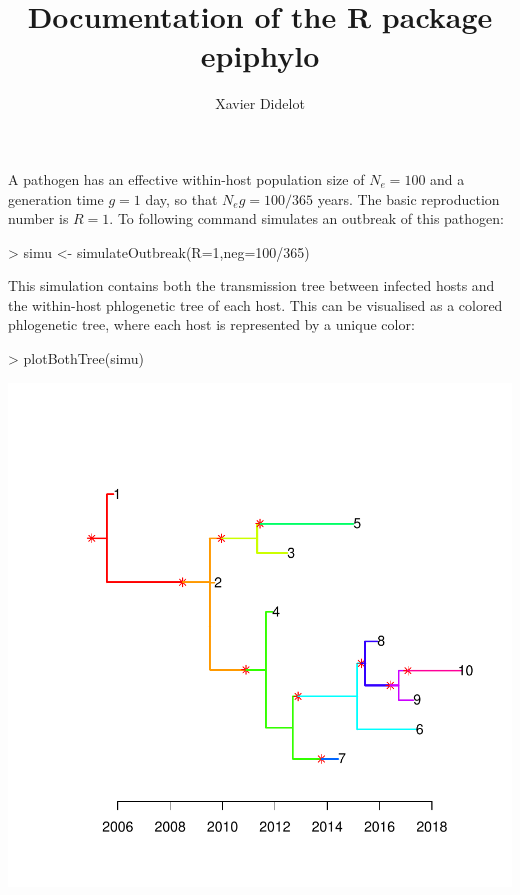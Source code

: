\documentclass[a4paper]{article}
\title{Documentation of the R package epiphylo}
\author{Xavier Didelot}
\begin{document}


\maketitle


A pathogen has an effective within-host population size of $N_e=100$ and a generation time $g=1$ day, so that $N_e g=100/365$ years. The basic reproduction number is $R=1$. To following command simulates an outbreak of this pathogen: 
\begin{Schunk}
\begin{Sinput}
> simu <- simulateOutbreak(R=1,neg=100/365)
\end{Sinput}
\end{Schunk}

This simulation contains both the transmission tree between infected hosts and the within-host phlogenetic tree of each host. This can be visualised as a colored phlogenetic tree, where each host is represented by a unique color:

\begin{center}
\begin{Schunk}
\begin{Sinput}
> plotBothTree(simu)
\end{Sinput}
\end{Schunk}
\includegraphics{epiphylo-003}
\end{center}
\end{document}
